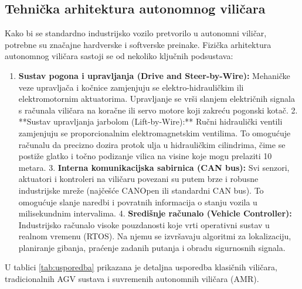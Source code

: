 \documentclass[12pt,a4paper]{article}
\begin{document}
\subsection{Tehnička arhitektura autonomnog viličara}
Kako bi se standardno industrijsko vozilo pretvorilo u autonomni viličar, potrebne su značajne hardverske i softverske preinake. Fizička arhitektura autonomnog viličara sastoji se od nekoliko ključnih podsustava:
\begin{enumerate}
  \item \textbf{Sustav pogona i upravljanja (Drive and Steer-by-Wire):} Mehaničke veze upravljača i kočnice zamjenjuju se elektro-hidrauličkim ili elektromotornim aktuatorima. Upravljanje se vrši slanjem električnih signala s računala viličara na koračne ili servo motore koji zakreću pogonski kotač.
2. **Sustav upravljanja jarbolom (Lift-by-Wire):** Ručni hidraulički ventili zamjenjuju se proporcionalnim elektromagnetskim ventilima. To omogućuje računalu da precizno dozira protok ulja u hidrauličkim cilindrima, čime se postiže glatko i točno podizanje vilica na visine koje mogu prelaziti 10 metara.
3. \textbf{Interna komunikacijska sabirnica (CAN bus):} Svi senzori, aktuatori i kontroleri na viličaru povezani su putem brze i robusne industrijske mreže (najčešće CANOpen ili standardni CAN bus). To omogućuje slanje naredbi i povratnih informacija o stanju vozila u milisekundnim intervalima.
4. \textbf{Središnje računalo (Vehicle Controller):} Industrijsko računalo visoke pouzdanosti koje vrti operativni sustav u realnom vremenu (RTOS). Na njemu se izvršavaju algoritmi za lokalizaciju, planiranje gibanja, praćenje zadanih putanja i obradu sigurnosnih signala.
\end{enumerate}

U tablici \ref{tab:usporedba} prikazana je detaljna usporedba klasičnih viličara, tradicionalnih AGV sustava i suvremenih autonomnih viličara (AMR).
\end{document}
